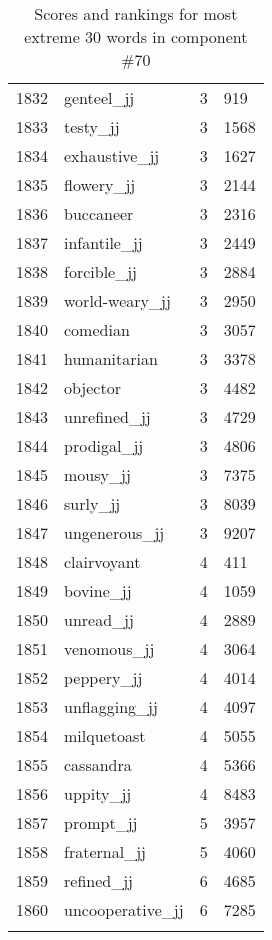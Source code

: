 \begin{longtable}[!htbp]{| rlr@{.}l |}
    1832 & genteel\_jj & 3 & 919 \\
    1833 & testy\_jj & 3 & 1568 \\
    1834 & exhaustive\_jj & 3 & 1627 \\
    1835 & flowery\_jj & 3 & 2144 \\
    1836 & buccaneer & 3 & 2316 \\
    1837 & infantile\_jj & 3 & 2449 \\
    1838 & forcible\_jj & 3 & 2884 \\
    1839 & world-weary\_jj & 3 & 2950 \\
    1840 & comedian & 3 & 3057 \\
    1841 & humanitarian & 3 & 3378 \\
    1842 & objector & 3 & 4482 \\
    1843 & unrefined\_jj & 3 & 4729 \\
    1844 & prodigal\_jj & 3 & 4806 \\
    1845 & mousy\_jj & 3 & 7375 \\
    1846 & surly\_jj & 3 & 8039 \\
    1847 & ungenerous\_jj & 3 & 9207 \\
    1848 & clairvoyant & 4 & 411 \\
    1849 & bovine\_jj & 4 & 1059 \\
    1850 & unread\_jj & 4 & 2889 \\
    1851 & venomous\_jj & 4 & 3064 \\
    1852 & peppery\_jj & 4 & 4014 \\
    1853 & unflagging\_jj & 4 & 4097 \\
    1854 & milquetoast & 4 & 5055 \\
    1855 & cassandra & 4 & 5366 \\
    1856 & uppity\_jj & 4 & 8483 \\
    1857 & prompt\_jj & 5 & 3957 \\
    1858 & fraternal\_jj & 5 & 4060 \\
    1859 & refined\_jj & 6 & 4685 \\
    1860 & uncooperative\_jj & 6 & 7285 \\
    \hline
    \caption{Scores and rankings for most extreme 30 words in component \#70} \\
\end{longtable}
